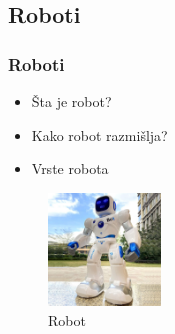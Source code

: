 \documentclass[10pt]{beamer}
\begin{document}
\subsection{Roboti}
\begin{frame}[fragile]\frametitle{Roboti}
	\begin{itemize}	
        \item Šta je robot?
        \item Kako robot razmišlja?
        \item Vrste robota
    \end{itemize}

    \begin{figure}[h!]
        \centering\includegraphics[height=3cm]{robot1.jpg} 
        \caption{Robot}
        \label{fig:robot}
        \end{figure}

\end{frame}
\end{document}
